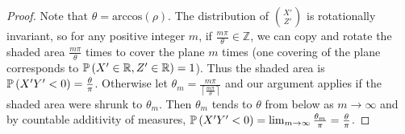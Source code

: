 \begin{proof}
Note that $\theta = \text{arccos}(\rho)$. The distribution of $\binom{X'}{Z'}$ is rotationally invariant, so for any positive integer $m$, if $\frac{m\pi}{\theta} \in \mathbb{Z}$, we can copy and rotate the shaded area $\frac{m\pi}{\theta}$ times to cover the plane $m$ times (one covering of the plane corresponds to $\prob{X' \in \mathbb{R}, Z' \in \mathbb{R}} = 1$). Thus the shaded area is $\prob{X'Y'<0} = \frac{\theta}{\pi}$. Otherwise let $\theta_{m} = \frac{m\pi}{\left\lceil\frac{m\pi}{\theta} \right\rceil}$ and our argument applies if the shaded area were shrunk to $\theta_{m}$. Then $\theta_{m}$ tends to $\theta$ from below as $m \to \infty$ and by countable additivity of measures, $\prob{X'Y' < 0} = \lim_{m\to\infty} \frac{\theta_{m}}{\pi} = \frac{\theta}{\pi}$.
\end{proof}